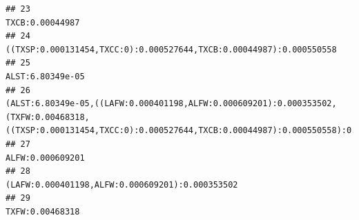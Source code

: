\documentclass[]{article}
\begin{document}
\begin{verbatim}
## 23                                                                                                                                                                                                                                                                                                                                                                                                                  TXCB:0.00044987
## 24                                                                                                                                                                                                                                                                                                                                                              ((TXSP:0.000131454,TXCC:0):0.000527644,TXCB:0.00044987):0.000550558
## 25                                                                                                                                                                                                                                                                                                                                                                                                                 ALST:6.80349e-05
## 26                                                                                                                                                                                                                                      (ALST:6.80349e-05,((LAFW:0.000401198,ALFW:0.000609201):0.000353502,(TXFW:0.00468318,((TXSP:0.000131454,TXCC:0):0.000527644,TXCB:0.00044987):0.000550558):0.00263375):0.000535248):0.0026018
## 27                                                                                                                                                                                                                                                                                                                                                                                                                 ALFW:0.000609201
## 28                                                                                                                                                                                                                                                                                                                                                                                  (LAFW:0.000401198,ALFW:0.000609201):0.000353502
## 29                                                                                                                                                                                                                                                                                                                                                                                                                  TXFW:0.00468318

\end{verbatim}
\end{document}
